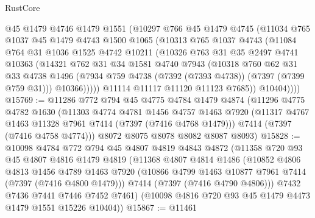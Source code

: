 \begin{lexlean}{RustCore}
\begin{coremodule}
            @45
            @1479
            @4746
            @1479
            @1551
            (@10297
              @766
              @45
              @1479
              @4745
              (@11034
                @765
                @1037
                @45
                @1479
                @4743
                @1500
                @1065
                (@10313
                  @765
                  @1037
                  @4743
                  (@11084
                    @764
                    @31
                    @1036
                    @1525
                    @4742
                    @10211
                    (@10326
                      @763
                      @31
                      @35
                      @2497
                      @4741
                      @10363
                      (@14321
                        @762
                        @31
                        @34
                        @1581
                        @4740
                        @7943
                        (@10318
                          @760
                          @62
                          @31
                          @33
                          @4738
                          @1496
                          (@7934 @759 @4738 (@7392 (@7393 @4738)) (@7397 (@7399 @759 @31)))
                          @10366)))))
                @11114
                @11117
                @11120
                @11123
                @7685))
            @10404))))
@15769 := @11286
    @772
    @794
    @45
    @4775
    @4784
    @1479
    @4874
    (@11296
      @4775
      @4782
      @1630
      (@11303
        @4774
        @4781
        @1456
        @4757
        @1463
        @7920
        (@11317 @4767 @1463 @11328 @7961 @7414 (@7397 (@7416 @4768 @1479)))
        @7414
        (@7397 (@7416 @4758 @4774)))
      @8072
      @8075
      @8078
      @8082
      @8087
      @8093)
@15828 := @10098
    @4784
    @772
    @794
    @45
    @4807
    @4819
    @4843
    @4872
    (@11358
      @720
      @93
      @45
      @4807
      @4816
      @1479
      @4819
      (@11368
        @4807
        @4814
        @1486
        (@10852
          @4806
          @4813
          @1456
          @4789
          @1463
          @7920
          (@10866 @4799 @1463 @10877 @7961 @7414 (@7397 (@7416 @4800 @1479)))
          @7414
          (@7397 (@7416 @4790 @4806)))
        @7432
        @7436
        @7441
        @7446
        @7452
        @7461)
      (@10098 @4816 @720 @93 @45 @1479 @4473 @1479 @1551 @15226 @10404))
@15867 := @11461

\end{coremodule}
\end{lexlean}

